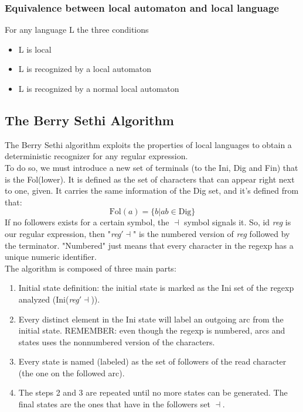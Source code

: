 			\subsubsection{Equivalence between local automaton and local language}
				For any language L the three conditions
				\begin{itemize}
					\item L is local
					\item L is recognized by a local automaton
					\item L is recognized by a normal local automaton
				\end{itemize}
		
		\subsection{The Berry Sethi Algorithm}
			The Berry Sethi algorithm exploits the properties of local languages to obtain a deterministic recognizer for any regular expression.\\
			To do so, we must introduce a new set of terminals (to the Ini, Dig and Fin) that is the Fol(lower). It is defined as the set of characters that can appear right next to one, given. It carries the same information of the Dig set, and it's defined from that:
			\begin{equation}
				\text{Fol}(a) = \{ b \vert ab \in \text{Dig} \}
			\end{equation}
			If no followers exists for a certain symbol, the $\dashv$ symbol signals it. So, id \emph{reg} is our regular expression, then "\emph{reg}$\prime \dashv$" is the numbered version of \emph{reg} followed by the terminator. "Numbered" just means that every character in the regexp has a unique numeric identifier.\\
			The algorithm is composed of three main parts:
			\begin{enumerate}
				\item Initial state definition: the initial state is marked as the Ini set of the regexp analyzed (Ini(\emph{reg}$\prime \dashv$)).
				\item Every distinct element in the Ini state will label an outgoing arc from the initial state. REMEMBER: even though the regexp is numbered, arcs and states uses the nonnumbered version of the characters. 
				\item Every state is named (labeled) as the set of followers of the read character (the one on the followed arc). 
				\item The steps 2 and 3 are repeated until no more states can be generated. The final states are the ones that have in the followers set $\dashv$.
			\end{enumerate}
			
